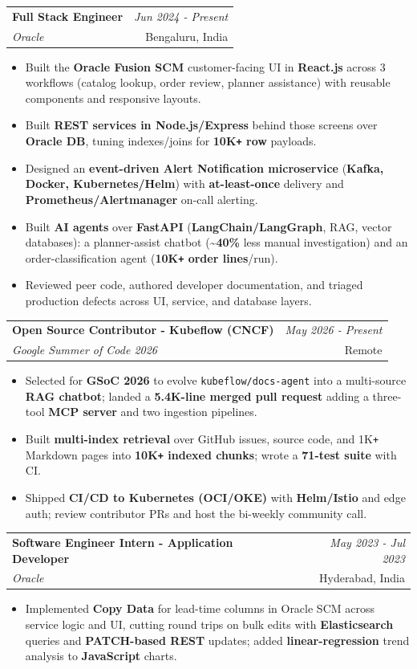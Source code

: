\documentclass[a4paper,10pt]{article}
\makeatletter
\newcommand{\resumeSubheading}[4]{
\vspace{0.5mm}\item
    \begin{tabular*}{0.98\textwidth}[t]{l@{\extracolsep{\fill}}r}
        \textbf{#1} & \textit{\footnotesize{#4}} \\
        \textit{\footnotesize{#3}} & \footnotesize{#2}\\
    \end{tabular*}
    \vspace{-2.8mm}
}
\newcommand{\resumeItemListStart}{\begin{justify}\begin{itemize}[leftmargin=3ex, rightmargin=1ex, noitemsep,labelsep=1.2mm,itemsep=0mm,topsep=0.4mm]\small}
\newcommand{\resumeItemListEnd}{\end{itemize}\end{justify}\vspace{-1.5mm}}
\makeatother
\begin{document}
  \resumeSubheading
    {Full Stack Engineer}{Bengaluru, India}
    {Oracle}{Jun 2024 - Present}
    \vspace{0.4mm}
    \resumeItemListStart
      \item {Built the \textbf{Oracle Fusion SCM} customer-facing UI in \textbf{React.js} across 3 workflows (catalog lookup, order review, planner assistance) with reusable components and responsive layouts.}
      \item {Built \textbf{REST services in Node.js/Express} behind those screens over \textbf{Oracle DB}, tuning indexes/joins for \textbf{10K\texttt{+} row} payloads.}
      \item {Designed an \textbf{event-driven Alert Notification microservice} (\textbf{Kafka, Docker, Kubernetes/Helm}) with \textbf{at-least-once} delivery and \textbf{Prometheus/Alertmanager} on-call alerting.}
      \item {Built \textbf{AI agents} over \textbf{FastAPI} (\textbf{LangChain/LangGraph}, RAG, vector databases): a planner-assist chatbot (\textbf{\textasciitilde{}40\%} less manual investigation) and an order-classification agent (\textbf{10K\texttt{+} order lines}/run).}
      \item {Reviewed peer code, authored developer documentation, and triaged production defects across UI, service, and database layers.}
    \resumeItemListEnd

  \resumeSubheading
    {Open Source Contributor - Kubeflow (CNCF)}{Remote}
    {Google Summer of Code 2026}{May 2026 - Present}
    \vspace{0.4mm}
    \resumeItemListStart
      \item {Selected for \textbf{GSoC 2026} to evolve \texttt{kubeflow/docs-agent} into a multi-source \textbf{RAG chatbot}; landed a \textbf{5.4K-line merged pull request} adding a three-tool \textbf{MCP server} and two ingestion pipelines.}
      \item {Built \textbf{multi-index retrieval} over GitHub issues, source code, and 1K\texttt{+} Markdown pages into \textbf{10K\texttt{+} indexed chunks}; wrote a \textbf{71-test suite} with CI.}
      \item {Shipped \textbf{CI/CD to Kubernetes (OCI/OKE)} with \textbf{Helm/Istio} and edge auth; review contributor PRs and host the bi-weekly community call.}
    \resumeItemListEnd

  \resumeSubheading
    {Software Engineer Intern - Application Developer}{Hyderabad, India}
    {Oracle}{May 2023 - Jul 2023}
    \vspace{0.4mm}
    \resumeItemListStart
      \item {Implemented \textbf{Copy Data} for lead-time columns in Oracle SCM across service logic and UI, cutting round trips on bulk edits with \textbf{Elasticsearch} queries and \textbf{PATCH-based REST} updates; added \textbf{linear-regression} trend analysis to \textbf{JavaScript} charts.}
    \resumeItemListEnd
\end{document}
